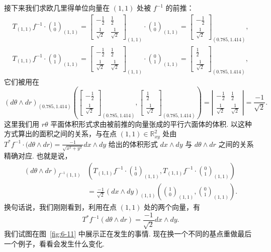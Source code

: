 接下来我们求欧几里得单位向量在 $(1,1)$ 处被 $f^{-1}$ 的前推：
\begin{align*}
T_{(1,1)}f^{-1}\cdot\binom{1}{0}_{(1,1)}
=
\begin{bmatrix}
-\frac12&\frac12\\
\frac{1}{\sqrt{2}}&\frac{1}{\sqrt{2}}
\end{bmatrix}_{(1,1)}
\cdot\binom{1}{0}_{(1,1)}
=
\begin{bmatrix}
-\frac12\\
\frac{1}{\sqrt{2}}
\end{bmatrix}_{(0.785,1.414)}, \\
T_{(1,1)}f^{-1}\cdot\binom{0}{1}_{(1,1)}
=
\begin{bmatrix}
-\frac12&\frac12\\
\frac{1}{\sqrt{2}}&\frac{1}{\sqrt{2}}
\end{bmatrix}_{(1,1)}
\cdot\binom{0}{1}_{(1,1)}
=
\begin{bmatrix}
\frac12\\
\frac{1}{\sqrt{2}}
\end{bmatrix}_{(0.785,1.414)},
\end{align*}
它们被用在
\[
(d\theta\wedge dr)_{(0.785,1.414)}\left(
\begin{bmatrix}
-\frac12\\
\frac{1}{\sqrt{2}}
\end{bmatrix}_{(0.785,1.414)},
\begin{bmatrix}
\frac12\\
\frac{1}{\sqrt{2}}
\end{bmatrix}_{(0.785,1.414)}
\right)
=\left|\begin{matrix}-\frac12&\frac12\\\frac{1}{\sqrt{2}}&\frac{1}{\sqrt{2}}\end{matrix}\right|
=\frac{-1}{\sqrt{2}}.
\]
这里我们用 $r\theta$ 平面体积形式求由被前推的向量张成的平行六面体的体积. 以这种方式算出的面积之间的关系，与在点 $(1,1)\in\mathbb{R}^2_{xy}$ 处由 $T^*f^{-1}\cdot\bigl(d\theta\wedge dr\bigr)=\frac{-1}{\sqrt{x^2+y^2}}dx\wedge dy$ 给出的体积形式 $dx\wedge dy$ 与 $d\theta\wedge dr$ 之间的关系精确对应. 也就是说，
\[
\begin{aligned}
(d\theta\wedge dr)_{f^{-1}(1,1)}&\left(T_{(1,1)}f^{-1}\cdot\binom{1}{0}_{(1,1)},T_{(1,1)}f^{-1}\cdot\binom{0}{1}_{(1,1)}\right)\\
&=\frac{-1}{\sqrt{2}}(dx\wedge dy)_{(1,1)}\left(\binom{1}{0}_{(1,1)},\binom{0}{1}_{(1,1)}\right).
\end{aligned}
\]
换句话说，我们刚刚看到，利用在点 $(1,1)$ 处的两个向量，有
\[
T^*f^{-1}(d\theta\wedge dr)=\frac{-1}{\sqrt{2}}dx\wedge dy.
\]
我们试图在图~\ref{fig:6-11} 中展示正在发生的事情. 现在换一个不同的基点重做最后一个例子，看看会发生什么变化.

